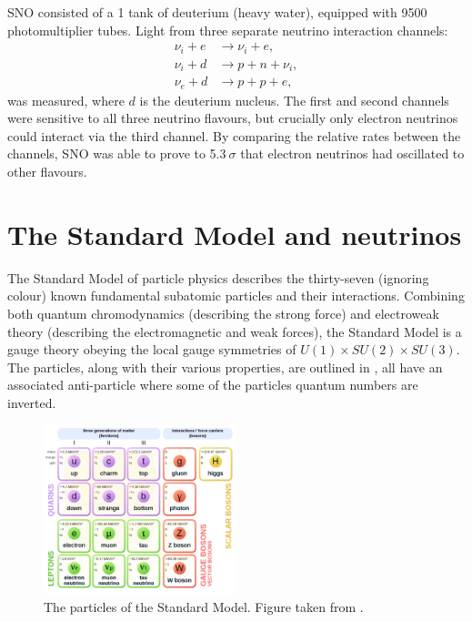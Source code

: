 SNO consisted of a \SI{1}{} tank of deuterium (heavy water), equipped with 9500
photomultiplier tubes. Light from three separate neutrino interaction channels:
\begin{align} %
    \nu_{i}+e & \rightarrow \nu_{i}+e, \\
    \nu_{i}+d & \rightarrow p+n+\nu_{i}, \\
    \nu_{e}+d & \rightarrow p+p+e,
\end{align}
was measured, where $d$ is the deuterium nucleus. The first and second channels were sensitive to
all three neutrino flavours, but crucially only electron neutrinos could interact via the third
channel. By comparing the relative rates between the channels, SNO was able to prove to
5.3$~\sigma$ that electron neutrinos had oscillated to other flavours.

\section{The Standard Model and neutrinos} %
\label{sec:theory_sm} %

The Standard Model of particle physics describes the thirty-seven (ignoring colour) known
fundamental subatomic particles and their interactions. Combining both quantum chromodynamics
(describing the strong force) and electroweak theory (describing the electromagnetic and weak
forces), the Standard Model is a gauge theory obeying the local gauge symmetries of $U(1) \times
SU(2) \times SU(3)$. The particles, along with their various properties, are outlined in
, all have an associated anti-particle where some of the particles quantum
numbers are inverted.

\begin{figure} %
    \includegraphics[origin=c,width=0.5\textwidth]{diagrams/3-theory/sm.pdf}
    \caption[The particles of the Standard Model]
    {The particles of the Standard Model. Figure taken from .}
    \label{fig:sm}
\end{figure}

